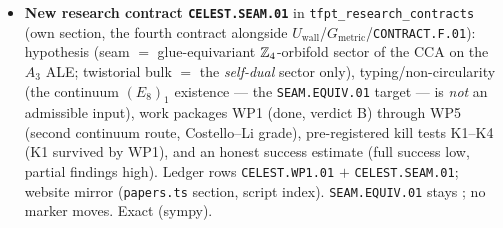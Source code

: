 \begin{itemize}[leftmargin=1.5em]
killed three ways, the false glue breaks additivity on $3112/6720$ pairs, rigidity $=\Aut(\Z_4)$.
\item \textbf{New research contract \texttt{CELEST.SEAM.01}} in \texttt{tfpt\_research\_contracts} (own
section, the fourth contract alongside $U_{\mathrm{wall}}$/$G_{\mathrm{metric}}$/\texttt{CONTRACT.F.01}):
hypothesis (seam $=$ glue-equivariant $\mathbb{Z}_4$-orbifold sector of the CCA on the $A_3$ ALE; twistorial bulk $=$
the \emph{self-dual} sector only), typing/non-circularity (the continuum $(E_8)_1$ existence --- the
\texttt{SEAM.EQUIV.01} target --- is \emph{not} an admissible input), work packages WP1 (done, verdict B)
through WP5 (second continuum route, Costello--Li grade), pre-registered kill tests K1--K4 (K1 survived by
WP1), and an honest success estimate (full success low, partial findings high). Ledger rows
\texttt{CELEST.WP1.01} $+$ \texttt{CELEST.SEAM.01}; website mirror (\texttt{papers.ts} section, script
index). \texttt{SEAM.EQUIV.01} stays \mO; no marker moves. Exact (sympy).
\end{itemize}


